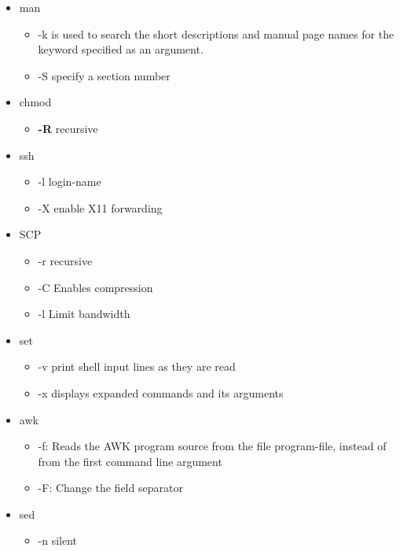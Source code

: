 \documentclass{report}
\begin{document}
    \begin{itemize}
        \item man 
            \begin{itemize}
                \item -k is used to search the short descriptions and manual page names for the keyword specified as an argument.
                \item -S specify a section number
            \end{itemize}
        \item chmod 
            \begin{itemize}
                \item \textbf{-R} recursive
            \end{itemize}
        \item ssh
            \begin{itemize}
                \item -l login-name
                \item -X enable X11 forwarding
            \end{itemize}
        \item SCP
            \begin{itemize}
                \item -r recursive
                \item -C  Enables compression
                \item -l Limit bandwidth
            \end{itemize}
        \item set
            \begin{itemize}
                \item -v print shell input lines as they are read
                \item -x displays expanded commands and its arguments
            \end{itemize}
        \item awk
            \begin{itemize}
                \item -f: Reads the AWK program source from the file program-file, instead of from the first command line argument
                \item -F: Change the field separator
            \end{itemize}
        \item sed
            \begin{itemize}
                \item -n silent

\end{itemize}
\end{itemize}
\end{document}

